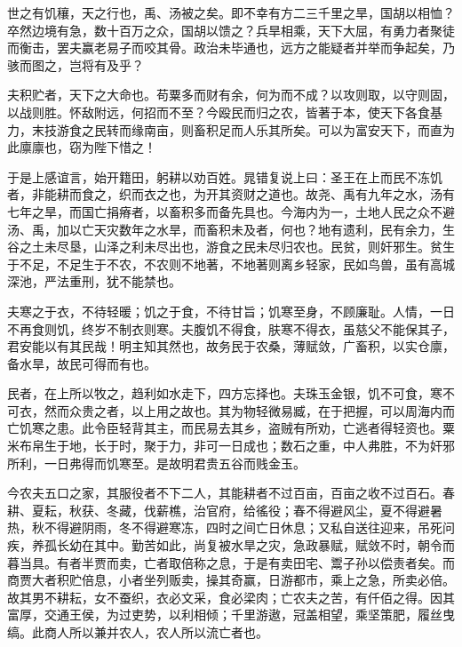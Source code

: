 \documentclass[12pt,UTF8]{ctexbook}
\begin{document}
世之有饥穰，天之行也，禹、汤被之矣。即不幸有方二三千里之旱，国胡以相恤？卒然边境有急，数十百万之众，国胡以馈之？兵旱相乘，天下大屈，有勇力者聚徒而衡击，罢夫赢老易子而咬其骨。政治未毕通也，远方之能疑者并举而争起矣，乃骇而图之，岂将有及乎？



夫积贮者，天下之大命也。苟粟多而财有余，何为而不成？以攻则取，以守则固，以战则胜。怀敌附远，何招而不至？今殴民而归之农，皆著于本，使天下各食基力，末技游食之民转而缘南亩，则畜积足而人乐其所矣。可以为富安天下，而直为此廪廪也，窃为陛下惜之！



于是上感谊言，始开籍田，躬耕以劝百姓。晁错复说上曰：圣王在上而民不冻饥者，非能耕而食之，织而衣之也，为开其资财之道也。故尧、禹有九年之水，汤有七年之旱，而国亡捐瘠者，以畜积多而备先具也。今海内为一，土地人民之众不避汤、禹，加以亡天灾数年之水旱，而畜积未及者，何也？地有遗利，民有余力，生谷之土未尽垦，山泽之利未尽出也，游食之民未尽归农也。民贫，则奸邪生。贫生于不足，不足生于不农，不农则不地著，不地著则离乡轻家，民如鸟兽，虽有高城深池，严法重刑，犹不能禁也。



夫寒之于衣，不待轻暖；饥之于食，不待甘旨；饥寒至身，不顾廉耻。人情，一日不再食则饥，终岁不制衣则寒。夫腹饥不得食，肤寒不得衣，虽慈父不能保其子，君安能以有其民哉！明主知其然也，故务民于农桑，薄赋敛，广畜积，以实仓廪，备水旱，故民可得而有也。



民者，在上所以牧之，趋利如水走下，四方忘择也。夫珠玉金银，饥不可食，寒不可衣，然而众贵之者，以上用之故也。其为物轻微易臧，在于把握，可以周海内而亡饥寒之患。此令臣轻背其主，而民易去其乡，盗贼有所劝，亡逃者得轻资也。粟米布帛生于地，长于时，聚于力，非可一日成也；数石之重，中人弗胜，不为奸邪所利，一日弗得而饥寒至。是故明君贵五谷而贱金玉。



今农夫五口之家，其服役者不下二人，其能耕者不过百亩，百亩之收不过百石。春耕、夏耘，秋获、冬藏，伐薪樵，治官府，给徭役；春不得避风尘，夏不得避暑热，秋不得避阴雨，冬不得避寒冻，四时之间亡日休息；又私自送往迎来，吊死问疾，养孤长幼在其中。勤苦如此，尚复被水旱之灾，急政暴赋，赋敛不时，朝令而暮当具。有者半贾而卖，亡者取倍称之息，于是有卖田宅、鬻子孙以偿责者矣。而商贾大者积贮倍息，小者坐列贩卖，操其奇赢，日游都市，乘上之急，所卖必倍。故其男不耕耘，女不蚕织，衣必文采，食必梁肉；亡农夫之苦，有仟佰之得。因其富厚，交通王侯，为过吏势，以利相倾；千里游遨，冠盖相望，乘坚策肥，履丝曳缟。此商人所以兼并农人，农人所以流亡者也。
\end{document}
